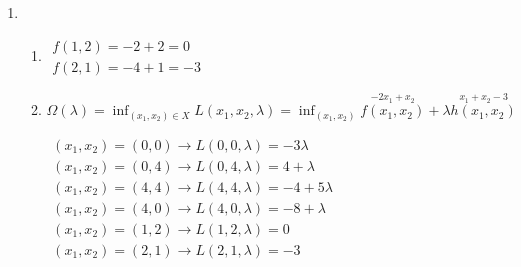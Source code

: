 


\begin{enumerate}[label=\color{red}\arabic*)]
	\item {}
	\begin{enumerate}[label=\color{red}\alph*)]
		\item {}
		$\begin{array}{l}
		f(1,2)=-2+2=0\\
		f(2,1)=-4+1=-3
		\end{array}$
		\item {}
		$\Omega(\lambda)=\inf_{(x_1,x_2)\in X}L(x_1,x_2,\lambda)=\inf_{(x_1,x_2)}\overset{-2x_1+x_2}{f(x_1,x_2)}+\lambda\overset{x_1+x_2-3}{h(x_1,x_2)}$
		
		$\begin{array}{l}
		(x_1,x_2)=(0,0)\longrightarrow L(0,0,\lambda)=-3\lambda\\
		(x_1,x_2)=(0,4)\longrightarrow L(0,4,\lambda)=4+\lambda\\
		(x_1,x_2)=(4,4)\longrightarrow L(4,4,\lambda)=-4+5\lambda\\
		(x_1,x_2)=(4,0)\longrightarrow L(4,0,\lambda)=-8+\lambda\\
		(x_1,x_2)=(1,2)\longrightarrow L(1,2,\lambda)=0\\
		(x_1,x_2)=(2,1)\longrightarrow L(2,1,\lambda)=-3\\
		\end{array}$
		
		\begin{center}
\end{center}
\end{enumerate}
\end{enumerate}
